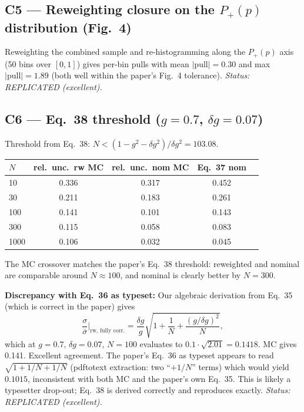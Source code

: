 \documentclass[11pt,letterpaper]{article}
\begin{document}
\subsection{C5 --- Reweighting closure on the $P_+(p)$ distribution (Fig.\ 4)}
Reweighting the combined sample and re-histogramming along the $P_+(p)$ axis (50 bins over
$[0,1]$) gives per-bin pulls with mean $|\mathrm{pull}| = 0.30$ and max $|\mathrm{pull}| = 1.89$
(both well within the paper's Fig.~4 tolerance).
\emph{Status: REPLICATED (excellent).}

\subsection{C6 --- Eq.\ 38 threshold ($g = 0.7$, $\delta g = 0.07$)}
Threshold from Eq.~38: $N < (1 - g^2 - \delta g^2) / \delta g^2 = 103.08$.

\begin{center}
\begin{tabular}{lcccc}
\toprule
$N$ & rel.\ unc.\ rw MC & rel.\ unc.\ nom MC & Eq.~37 nom \\
\midrule
10    & 0.336 & 0.317 & 0.452 \\
30    & 0.211 & 0.183 & 0.261 \\
100   & 0.141 & 0.101 & 0.143 \\
300   & 0.115 & 0.058 & 0.083 \\
1000  & 0.106 & 0.032 & 0.045 \\
\bottomrule
\end{tabular}
\end{center}

The MC crossover matches the paper's Eq.~38 threshold: reweighted and nominal are comparable
around $N \approx 100$, and nominal is clearly better by $N = 300$.

\textbf{Discrepancy with Eq.\ 36 as typeset:} Our algebraic derivation from Eq.~35 (which is
correct in the paper) gives
\begin{equation}
  \frac{\sigma}{\bar\sigma}\bigg|_\text{rw, fully corr.}
  = \frac{\delta g}{g}\sqrt{1 + \frac{1}{N} + \frac{(g/\delta g)^2}{N}},
\end{equation}
which at $g = 0.7$, $\delta g = 0.07$, $N = 100$ evaluates to
$0.1 \cdot \sqrt{2.01} = 0.1418$. MC gives 0.141. Excellent agreement.
The paper's Eq.~36 as typeset appears to read $\sqrt{1 + 1/N + 1/N}$
(pdftotext extraction: two ``$+ 1/N$'' terms) which would yield $0.1015$,
inconsistent with both MC and the paper's own Eq.~35. This is likely a typesetter drop-out;
Eq.~38 is derived correctly and reproduces exactly.
\emph{Status: REPLICATED (excellent).}
\end{document}

